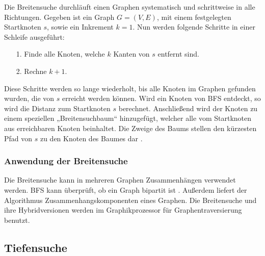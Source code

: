 Die Breitensuche durchläuft einen Graphen systematisch und schrittweise in alle Richtungen. Gegeben ist ein Graph $G = (V, E)$, mit einem festgelegten Startknoten $s$, sowie ein Inkrement $k=1$. Nun werden folgende Schritte in einer Schleife ausgeführt:
\begin{itemize}
\item[1.] Finde alle Knoten, welche $k$ Kanten von $s$ entfernt sind.
\item[2.] Rechne $k + 1$.
\end{itemize}
Diese Schritte werden so lange wiederholt, bis alle Knoten im Graphen gefunden wurden, die von $s$ erreicht werden können. Wird ein Knoten von BFS entdeckt, so wird die Distanz zum Startknoten $s$ berechnet. Anschließend wird der Knoten zu einem speziellen „Breitensuchbaum“ hinzugefügt, welcher alle vom Startknoten aus erreichbaren Knoten beinhaltet. Die Zweige des Baums stellen den kürzesten Pfad von $s$ zu den Knoten des Baumes dar \cite{Cormen.2009}.

\subsubsection{Anwendung der Breitensuche}
Die Breitensuche kann in mehreren Graphen Zusammenhängen verwendet werden.  BFS kann überprüft, ob ein Graph bipartit ist \cite{propTest}. Außerdem liefert der Algorithmus Zusammenhangskomponenten eines Graphen\cite{schmitz}. Die Breitensuche und ihre Hybridversionen\cite{effHyb} werden im Graphikprozessor für Graphentraversierung benutzt\cite{scaleGPU}. %

\subsection{Tiefensuche}

